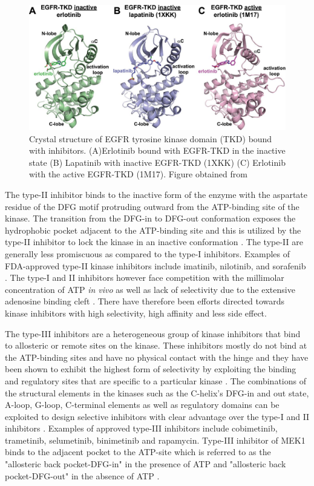 \documentclass[a4paper, 11pt]{report}
\begin{document}
\begin{figure}[H]
	\includegraphics[width=.8\linewidth]{figures/erlotinib.jpg}
	\centering
	\caption{Crystal structure of EGFR tyrosine kinase domain (TKD) bound with inhibitors. (A)Erlotinib  bound with EGFR-TKD in the inactive state (B) Lapatinib with inactive EGFR-TKD (1XKK) (C) Erlotinib with the active EGFR-TKD (1M17). Figure obtained from \cite{park2012erlotinib}}
	\label{erlotinib}
\end{figure}
The type-II inhibitor binds to the inactive form of the enzyme with the aspartate residue of the DFG motif protruding outward from the ATP-binding site of the kinase. The transition from the DFG-in to DFG-out conformation exposes the hydrophobic pocket adjacent to the ATP-binding site and this is utilized by the type-II inhibitor to lock the kinase in an inactive conformation \cite{cowan2009structural}. The type-II are generally less promiscuous as compared to the type-I inhibitors. Examples of FDA-approved type-II kinase inhibitors include imatinib, nilotinib, and sorafenib \cite{fabbro2015ten}. The type-I and II inhibitors however face competition with the millimolar concentration of ATP \textit{in vivo} as well as lack of selectivity due to the extensive adenosine binding cleft \cite{lamba2012new}. There have therefore been  efforts directed towards kinase inhibitors with high selectivity, high affinity and less side effect.\par
The type-III inhibitors are a heterogeneous group of kinase inhibitors that bind to allosteric or remote sites on the kinase. These inhibitors mostly do not bind at the ATP-binding sites and have no physical contact with the hinge and they have been shown to exhibit the highest form of selectivity by exploiting the binding and regulatory sites that are specific to a particular kinase \cite{fabbro2015ten}. The combinations of the structural elements in the kinases such as the C-helix's DFG-in and out state, A-loop, G-loop, C-terminal elements as well as regulatory domains can be exploited to design selective inhibitors with clear advantage over the type-I and II inhibitors \cite{cowan2009structural}. Examples of approved type-III inhibitors include cobimetinib, trametinib, selumetinib, binimetinib and rapamycin. Type-III inhibitor of MEK1 binds to the adjacent pocket to the ATP-site which is referred to as the "allosteric back pocket-DFG-in" in the presence of ATP and "allosteric back pocket-DFG-out" in the absence of ATP \cite{fabbro2015ten}. 
\end{document}
